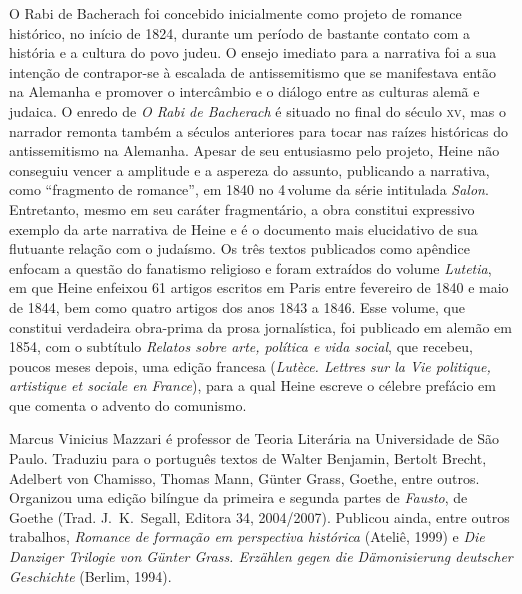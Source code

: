 \begin{resumopage}
\item[O Rabi de Bacherach] foi concebido inicialmente como projeto de romance histórico,
no início de 1824, durante um período de bastante
contato com a história e a cultura do povo judeu. O ensejo imediato
para a narrativa foi a sua intenção de contrapor{}-se à escalada de
antissemitismo que se manifestava então na Alemanha e promover o
intercâmbio e o diálogo entre as culturas alemã e judaica. O enredo
de \textit{O Rabi de Bacherach} é situado no final do século \textsc{xv}, mas o
narrador remonta também a séculos anteriores para tocar nas raízes
históricas do antissemitismo na Alemanha. Apesar de seu entusiasmo
pelo projeto, Heine não conseguiu vencer a amplitude e a aspereza do
assunto, publicando a narrativa, como “fragmento de romance”, em 1840
no 4\oi\,volume da série intitulada \textit{Salon}. Entretanto, mesmo em seu
caráter fragmentário, a obra constitui expressivo exemplo da
arte narrativa de Heine e é o documento mais elucidativo de sua
flutuante relação com o judaísmo.
Os três textos publicados como apêndice enfocam a questão do
fanatismo religioso e foram extraídos do volume \textit{Lutetia}, em
que Heine enfeixou 61 artigos escritos em Paris entre fevereiro de 1840
e maio de 1844, bem como quatro artigos dos anos 1843 a 1846. Esse
volume, que constitui verdadeira obra{}-prima da prosa jornalística,
foi publicado em alemão em 1854, com o subtítulo \textit{Relatos sobre
arte, política e vida social}, que recebeu, poucos meses depois, uma edição
francesa (\textit{Lutèce. Lettres sur la Vie politique, artistique et
sociale en France}), para a qual Heine escreve o célebre prefácio em
que comenta o advento do comunismo.

\item[Marcus Vinicius Mazzari] é professor de Teoria Literária na Universidade
de São Paulo. Traduziu para o português textos de Walter Benjamin, Bertolt
Brecht, Adelbert von Chamisso, Thomas Mann, Günter Grass, Goethe, entre outros.
Organizou uma edição bilíngue da primeira e segunda partes de \textit{Fausto},
de Goethe (Trad. J.~K.~Segall, Editora 34, 2004/2007). Publicou ainda, entre
outros trabalhos, \textit{Romance de formação em perspectiva histórica}
(Ateliê, 1999) e \textit{Die Danziger Trilogie von Günter Grass. Erzählen gegen
die Dämonisierung deutscher Geschichte} (Berlim, 1994).
\end{resumopage}
